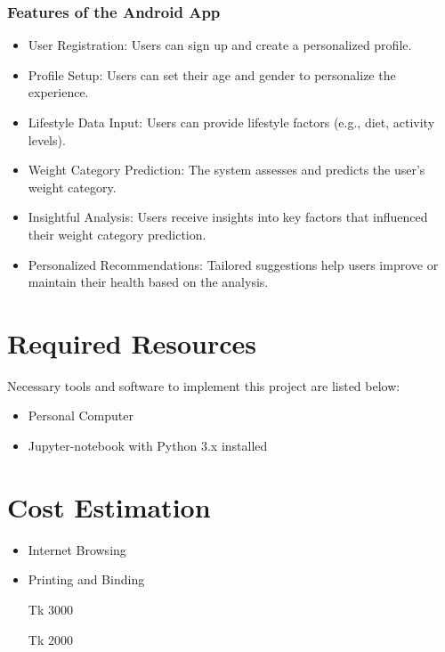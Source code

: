 \subsubsection{Features of the Android App}
\begin{itemize}
    \item User Registration: Users can sign up and create a personalized profile.  

    \item Profile Setup: Users can set their age and gender to personalize the experience. 

    \item Lifestyle Data Input: Users can provide lifestyle factors (e.g., diet, activity levels). 

    \item Weight Category Prediction: The system assesses and predicts the user’s weight category. 

   \item Insightful Analysis: Users receive insights into key factors that influenced their weight category prediction. 
   \item Personalized Recommendations: Tailored suggestions help users improve or maintain their health based on the analysis. 
\end{itemize}
\newpage

\section{Required Resources}

Necessary tools and software to implement this project are listed below:

\begin{itemize}
    \item Personal Computer
    \item Jupyter-notebook with Python 3.x installed
\end{itemize}


\section{Cost Estimation}


\begin{multicols}{2}
    \begin{itemize}
        \item Internet Browsing
        \item Printing and Binding
        \item[Tk] 3000
        \item[Tk] 2000
    \end{itemize}
\end{multicols}

